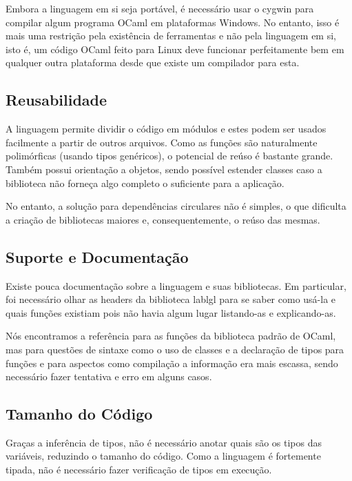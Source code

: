 \documentclass[a4paper,10pt]{article}
\begin{document}
		Embora a linguagem em si seja portável, é necessário usar o cygwin para compilar algum programa OCaml em plataformas Windows. No entanto, isso é mais uma restrição pela existência de ferramentas e não pela linguagem em si, isto é, um código OCaml feito para Linux deve funcionar perfeitamente bem em qualquer outra plataforma desde que existe um compilador para esta.
		
	\subsection{Reusabilidade}
	
		A linguagem permite dividir o código em módulos e estes podem ser usados facilmente a partir de outros arquivos. Como as funções são naturalmente polimórficas (usando tipos genéricos), o potencial de reúso é bastante grande. Também possui orientação a objetos, sendo possível estender classes caso a biblioteca não forneça algo completo o suficiente para a aplicação.
		
		No entanto, a solução para dependências circulares não é simples, o que dificulta a criação de bibliotecas maiores e, consequentemente, o reúso das mesmas.
	
	\subsection{Suporte e Documentação}
	
		Existe pouca documentação sobre a linguagem e suas bibliotecas. Em particular, foi necessário olhar as headers da biblioteca lablgl para se saber como usá-la e quais funções existiam pois não havia algum lugar listando-as e explicando-as.
		
		Nós encontramos a referência para as funções da biblioteca padrão de OCaml, mas para questões de sintaxe como o uso de classes e a declaração de tipos para funções e para aspectos como compilação a informação era mais escassa, sendo necessário fazer tentativa e erro em alguns casos.
		
	\subsection{Tamanho do Código}
		
		Graças a inferência de tipos, não é necessário anotar quais são os tipos das variáveis, reduzindo o tamanho do código. Como a linguagem é fortemente tipada, não é necessário fazer verificação de tipos em execução.
		
\end{document}
